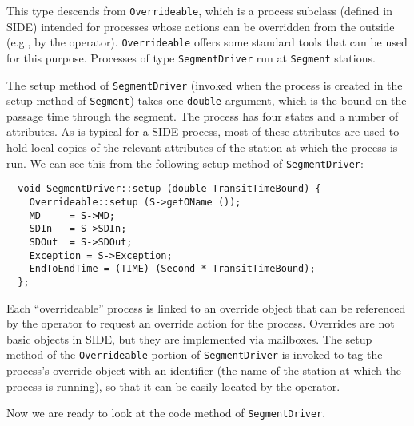 This type descends from {\tt Overrideable}, which is a process subclass
(defined in SIDE) intended for processes whose actions can be overridden
from the outside (e.g., by the operator).
{\tt Overrideable} offers some standard tools that can be used for this
purpose.
Processes of type {\tt SegmentDriver} run at {\tt Segment} stations.

The setup method of {\tt SegmentDriver} (invoked when the process is
created in the setup method of {\tt Segment}) takes one {\tt double}
argument, which is the bound on the passage time through the segment.
The process has four states and a number of attributes.
As is typical for a SIDE process, most of these attributes are used to
hold local copies of the relevant attributes of the station at which the
process is run.
We can see this from the following
setup method of {\tt SegmentDriver}:

{\small\begin{verbatim}
  void SegmentDriver::setup (double TransitTimeBound) {
    Overrideable::setup (S->getOName ());
    MD     = S->MD;
    SDIn   = S->SDIn;
    SDOut  = S->SDOut;
    Exception = S->Exception;
    EndToEndTime = (TIME) (Second * TransitTimeBound);
  };
\end{verbatim}}

Each ``overrideable'' process is linked to an override object that can
be referenced by the operator to request an override action for the process.
Overrides are not basic objects in SIDE, but they are implemented via
mailboxes.
The setup method of the {\tt Overrideable} portion of {\tt SegmentDriver}
is invoked to tag the process's override object
with an identifier (the name of the
station at which the process is running), so that it can be easily
located by the operator.

Now we are ready to look at the code method of {\tt SegmentDriver}.

